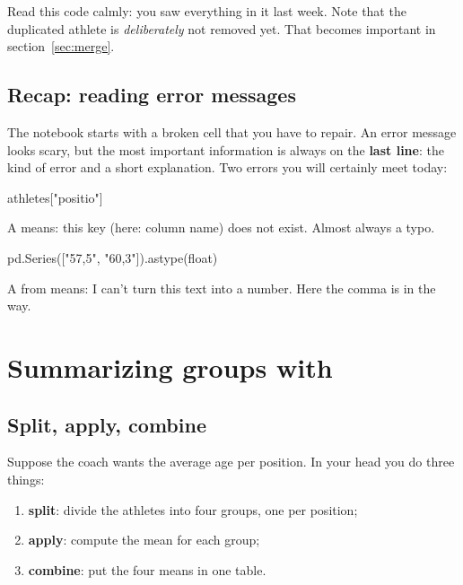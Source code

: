 \documentclass[11pt,a4paper]{article}
\begin{document}
Read this code calmly: you saw everything in it last week. Note that the
duplicated athlete is \emph{deliberately} not removed yet. That becomes
important in section~\ref{sec:merge}.

\subsection*{Recap: reading error messages}

The notebook starts with a broken cell that you have to repair. An error
message looks scary, but the most important information is always on
the \textbf{last line}: the kind of error and a short explanation. Two
errors you will certainly meet today:

\begin{python}[error]
athletes["positio"]
\end{python}

A  means: this key (here: column name) does not exist.
Almost always a typo.

\begin{python}[error]
pd.Series(["57,5", "60,3"]).astype(float)
\end{python}

A  from  means: I can't turn this
text into a number. Here the comma is in the way.

\section{Summarizing groups with }

\subsection{Split, apply, combine}

Suppose the coach wants the average age per position. In your head you
do three things:

\begin{enumerate}
  \item \textbf{split}: divide the athletes into four groups, one per
        position;
  \item \textbf{apply}: compute the mean for each group;
  \item \textbf{combine}: put the four means in one table.
\end{enumerate}
\end{document}
